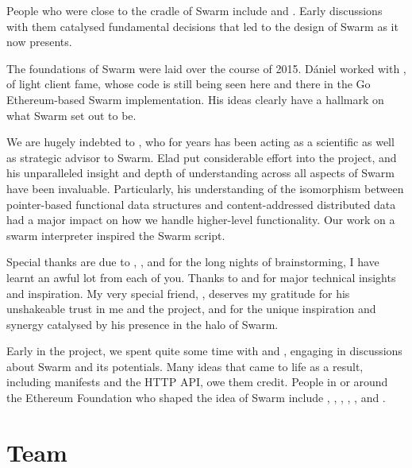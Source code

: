 People who were close to the cradle of Swarm include  and . Early discussions with them catalysed fundamental decisions that led to the design of Swarm as it now presents.

The foundations of Swarm were laid over the course of 2015.
D{\'a}niel worked with , of light client fame, whose code is still being seen here and there in the Go Ethereum-based Swarm implementation. His ideas clearly have a hallmark on what Swarm set out to be. 

We are hugely indebted to , who for years has been acting as a scientific as well as strategic advisor to Swarm. Elad put considerable effort into the project, and his unparalleled insight and depth of understanding across all aspects of Swarm have been invaluable. Particularly, his understanding of the isomorphism between pointer-based functional data structures and content-addressed distributed data had a major impact on how we handle higher-level functionality. Our work on a swarm interpreter inspired the Swarm script.

Special thanks are due to , , and  for the long nights of brainstorming, I have learnt an awful lot from each of you. Thanks to  and  for major technical insights and inspiration.
My very special friend, , deserves my gratitude for his unshakeable trust in me and the project, and for the unique inspiration and synergy catalysed by his presence in the halo of Swarm.

Early in the project, we spent quite some time with  and , engaging in discussions about Swarm and its potentials. Many ideas that came to life as a result, including manifests and the HTTP API, owe them credit. People in or around the Ethereum Foundation who shaped the idea of Swarm include , , , , , and . 

\section*{Team}


